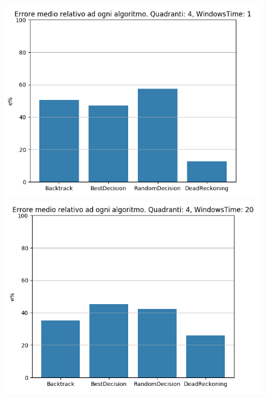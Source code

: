 \documentclass[12pt,a4paper,openright,twoside]{report}
\begin{document}
\begin{figure}[H]
\centering 
\includegraphics[scale=0.4]{secondChart4-1} 
\includegraphics[scale=0.4]{secondChart4-20} 
\end{figure}
\end{document}

